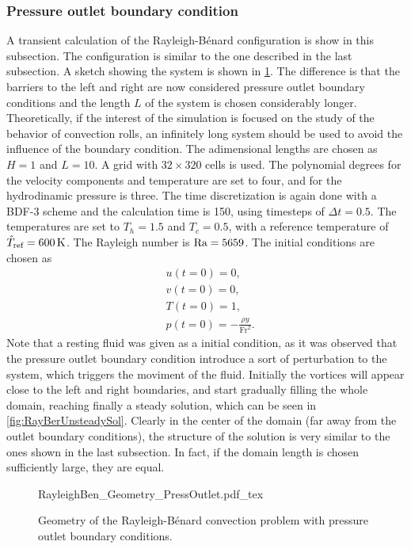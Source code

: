 \subsubsection{Pressure outlet boundary condition}\label{ssec:MultipleCellConv}
A transient calculation of the Rayleigh-Bénard configuration is show in this subsection. The configuration is similar to the one described in the last subsection. A sketch showing the system is shown in \cref{fig:RayBenGeometry}. The difference is that the barriers to the left and right are now considered pressure outlet boundary conditions and the length $L$ of the system is chosen considerably longer. Theoretically, if the interest of the simulation is focused on the study of the behavior of convection rolls, an infinitely long system should be used to avoid the influence of the boundary condition. The adimensional lengths are chosen as $H=1$ and $L=10$. A grid with $32\times320$ cells is used. The polynomial degrees for the velocity components and temperature are set to four, and for the hydrodinamic pressure is three. The time discretization is again done with a BDF-3 scheme and the calculation time is 150, using timesteps of $\Delta t = 0.5$. The temperatures are set to $T_h = 1.5$ and $T_c = 0.5$, with a reference temperature of $\hat T_{\text{ref}} = \SI{600}{\kelvin}$. The Rayleigh number is $\text{Ra} = 5659$. The initial conditions are chosen as
\begin{subequations} 
	\begin{align}
		&u(t=0) = 0, \\
		&v(t=0) = 0, \\
		&T(t=0) = 1, \\
		&p(t=0) = -\frac{\rho y}{\text{Fr}^2}.
	\end{align}
\end{subequations}
Note that a resting fluid was given as a initial condition, as it was observed that the pressure outlet boundary condition introduce a sort of perturbation to the system, which triggers the moviment of the fluid. Initially the vortices will appear close to the left and right boundaries, and start gradually filling the whole domain, reaching finally a steady solution, which can be seen in \cref{fig:RayBerUnsteadySol}. Clearly in the center of the domain (far away from the outlet boundary conditions), the structure of the solution is very similar to the ones shown in the last subsection. In fact, if the domain length is chosen sufficiently large, they are equal. 



\begin{figure}[bt]
	\begin{center}
		\def\svgwidth{0.93\textwidth}
		{RayleighBen_Geometry_PressOutlet.pdf_tex}
		\caption{Geometry of the Rayleigh-Bénard convection problem with pressure outlet boundary conditions. }
		\label{fig:RayBenGeometry}
	\end{center}
\end{figure}

